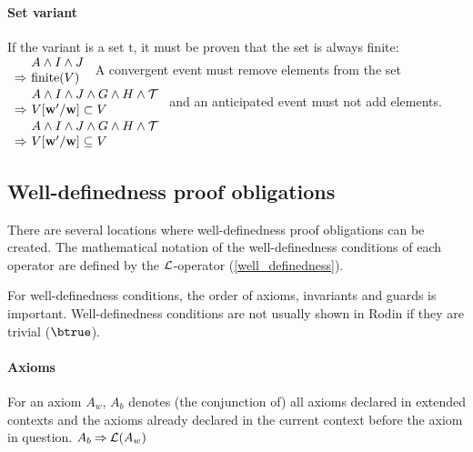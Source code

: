 \paragraph{Set variant}
\label{set_variant}
  If the variant is a set t, it must be proven that the set is always finite:
%
  {$\begin{array}{r@{\ }l}
      & A \land I \land J \\
      \limp & \bfinite(V)
    \end{array}$}
A convergent event must remove elements from the set
%
  {$\begin{array}{r@{\ }l}
      & A \land I \land J \land G \land H \land \concbeforeafter \\
      \limp & V[\varlist{w}'/\varlist{w}]\subset V
    \end{array}$}
and an anticipated event must not add elements.
%
  {$\begin{array}{r@{\ }l}
      & A \land I \land J \land G \land H \land \concbeforeafter \\
      \limp & V[\varlist{w}'/\varlist{w}]\subseteq V
    \end{array}$}

\subsection{Well-definedness proof obligations}
\label{well_definedness_proof_obligations}
There are several locations where well-definedness proof obligations can be created.
The mathematical notation of the well-definedness conditions
of each operator are defined by the $\mathcal{L}$-operator (\ref{well_definedness}).

For well-definedness conditions, the order of axioms, invariants and guards is important.
Well-definedness conditions are not usually shown in Rodin if they are trivial ($\btrue$).

\paragraph{Axioms}
\label{well_definedness_of_axioms}
For an axiom $A_w$, $A_b$ denotes (the conjunction of) all axioms declared
  in extended contexts and the axioms already declared in
  the current context before the axiom in question.
%
  {$A_b \mathbin\Rightarrow \mathcal{L}(A_w)$}

